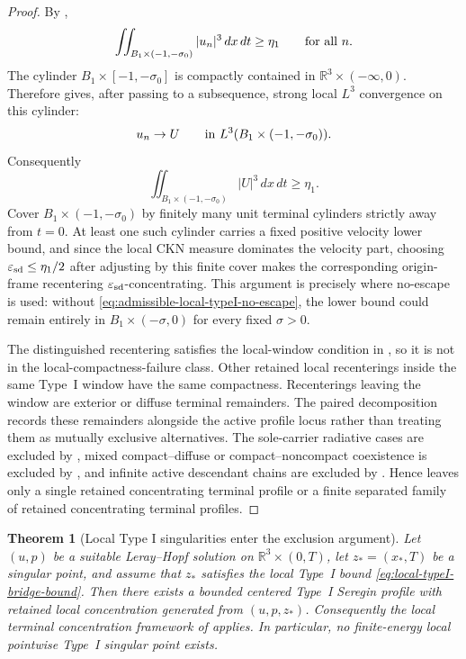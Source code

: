 \documentclass[11pt]{amsart}
\numberwithin{equation}{section}
\theoremstyle{plain}
\newtheorem{theorem}{Theorem}[section]
\theoremstyle{definition}
\theoremstyle{remark}
\newcommand{\R}{\mathbb R}
\newcommand{\eps}{\varepsilon}
\begin{document}
\begin{proof}
By ,
\[
   \iint_{B_1\times(-1,-\sigma_0)} |u_n|^3\,dx\,dt\ge\eta_1
   \qquad\hbox{for all }n .
\]
The cylinder \(B_1\times[-1,-\sigma_0]\) is compactly contained in
\(\mathbb R^3\times(-\infty,0)\).  Therefore
 gives, after passing to a
subsequence, strong local \(L^3\) convergence on this cylinder:
\[
   u_n\to U
   \qquad\hbox{in }L^3(B_1\times(-1,-\sigma_0)).
\]
Consequently
\[
   \iint_{B_1\times(-1,-\sigma_0)} |U|^3\,dx\,dt\ge\eta_1 .
\]
Cover \(B_1\times(-1,-\sigma_0)\) by finitely many unit terminal cylinders
strictly away from \(t=0\).  At least one such cylinder carries a fixed positive
velocity lower bound, and since the local CKN measure dominates the velocity
part, choosing \(\eps_{\rm sd}\le\eta_1/2\) after adjusting by this finite cover
makes the corresponding origin-frame recentering \(\eps_{\rm sd}\)-concentrating.
This argument is precisely where no-escape is used: without
\eqref{eq:admissible-local-typeI-no-escape}, the lower bound could remain
entirely in \(B_1\times(-\sigma,0)\) for every fixed \(\sigma>0\).

The distinguished recentering satisfies the local-window condition in
, so it is not in the
local-compactness-failure class.  Other retained local recenterings inside the
same Type~I window have the same compactness.  Recenterings leaving the window
are exterior or diffuse terminal remainders.  The paired decomposition
 records these remainders alongside the active
profile locus rather than treating them as mutually exclusive alternatives.  The
sole-carrier radiative cases are excluded by
, mixed compact--diffuse or
compact--noncompact coexistence is excluded by
, and infinite active descendant chains are excluded
by .  Hence
 leaves only a single retained concentrating
terminal profile or a finite separated family of retained concentrating terminal
profiles.
\end{proof}

\begin{theorem}[Local Type I singularities enter the exclusion argument]
\label{thm:local-typeI-entry-or-discharge}
Let \((u,p)\) be a suitable Leray--Hopf solution on
\(\R^3\times(0,T)\), let \(z_*=(x_*,T)\) be a singular point, and assume that
\(z_*\) satisfies the local Type~I bound
\eqref{eq:local-typeI-bridge-bound}.  Then there exists a bounded centered
Type~I Seregin profile with retained local concentration generated from
\((u,p,z_*)\).  Consequently the local terminal concentration framework of
 applies.  In particular, no
finite-energy local pointwise Type~I singular point exists.
\end{theorem}
\end{document}
